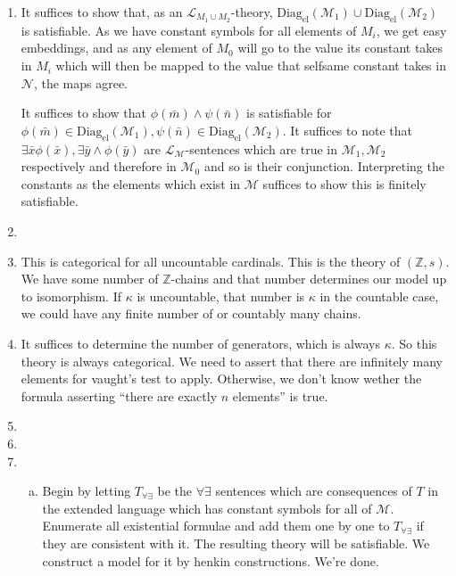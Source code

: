 \documentclass[10pt]{article}
\newcommand{\Z}{\mathbb{Z}}
\newcommand{\A}{\forall}
\newcommand{\mcM}{\mathcal{M}}
\newcommand{\mcN}{\mathcal{N}}
\newcommand{\mcL}{\mathcal{L}}
\newcommand{\E}{\exists}
\newcommand{\eldiag}{\text{Diag}_\text{el}}
\begin{document}
\begin{enumerate}[1.]
\item It suffices to show that, as an \(\mcL_{M_1\cup M_2}\)-theory, \(\eldiag(\mcM_1) \cup \eldiag(\mcM_2)\) is satisfiable. As we have constant symbols for all elements of \(M_i\), we get easy embeddings, and as any element of \(M_0\) will go to the value its constant takes in \(M_i\) which will then be mapped to the value that selfsame constant takes in \(\mcN\), the maps agree. 

It suffices to show that \(\phi(\bar{m}) \land \psi(\bar{n})\) is satisfiable for \(\phi(\bar{m}) \in \eldiag(\mcM_1), \psi(\bar{n}) \in \eldiag(\mcM_2)\). It suffices to note that \(\E \bar{x} \phi(\bar{x}),  \E \bar{y} \land \phi(\bar{y})\) are \(\mcL_\mcM\)-sentences which are true in \(\mcM_1, \mcM_2\) respectively and therefore in \(\mcM_0\) and so is their conjunction. Interpreting the constants as the elements which exist in \(\mcM\) suffices to show this is finitely satisfiable.  

\item
 
\item This is categorical for all uncountable cardinals. This is the theory of \((\Z, s)\). We have some number of \(\Z\)-chains and that number determines our model up to isomorphism. If \(\kappa\) is uncountable, that number is \(\kappa\) in the countable case, we could have any finite number of or countably many chains. 
 
\item It suffices to determine the number of generators, which is always \(\kappa\). So this theory is always categorical. We need to assert that there are infinitely many elements for vaught's test to apply. Otherwise, we don't know wether the formula asserting ``there are exactly \(n\) elements'' is true. 
 
\item 

\item
 
\item 
  \begin{enumerate}[a)]
  \item Begin by letting \(T_{\A\E}\) be the \(\A\E\) sentences which are consequences of \(T\) in the extended language which has constant symbols for all of \(\mcM\). 
Enumerate all existential formulae and add them one by one to \(T_{\A\E}\) if they are consistent with it. 
The resulting theory will be satisfiable. 
We construct a model for it by henkin constructions. We're done. 


\end{enumerate}
\end{enumerate}
\end{document}
